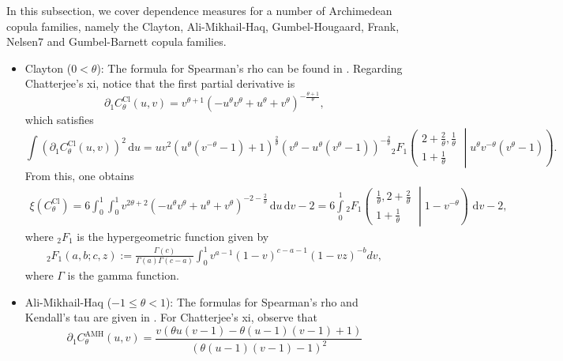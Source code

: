 \documentclass{article}
\def\of#1{\left(#1\right)} %
\newcommand{\de}{\mathrm{\,d}}
\begin{document}
In this subsection, we cover dependence measures for a number of Archimedean copula families, namely the Clayton, Ali-Mikhail-Haq, Gumbel-Hougaard, Frank, Nelsen7 and Gumbel-Barnett copula families.

\begin{itemize}
    \item Clayton ($0<\theta$): 
    The formula for Spearman's rho can be found in \cite[Example 5.4]{Nelsen-2006}.
    Regarding Chatterjee's xi, notice that the first partial derivative is 
    \[
        \partial_1 C^{\text{Cl}}_\theta(u, v)
        = v^{\theta + 1} \left(- u^{\theta} v^{\theta} + u^{\theta} + v^{\theta}\right)^{- \frac{\theta + 1}{\theta}}
    ,\]
    which satisfies
    \small
    \[
        \int(\partial_1 C^{\text{Cl}}_\theta(u, v))^2\de u
        = u v^{2} \left(u^{\theta} \left(v^{- \theta}-1\right) + 1\right)^{\frac{2}{\theta}} \left(v^{\theta} - u^{\theta} \left(v^{\theta} - 1\right) \right)^{- \frac{2}{\theta}} {{}_{2}F_{1}\left(\begin{matrix} 2 + \frac{2}{\theta}, \frac{1}{\theta} \\ 1 + \frac{1}{\theta} \end{matrix}\middle| {u^{\theta} v^{- \theta} (v^{\theta} - 1)} \right)}
    .\]
    \normalsize
    From this, one obtains
    \small
    \begin{align*}
        \xi\of{C^{\text{Cl}}_{\theta}}
        = 6 \int_0^1\int_0^1 v^{2 \theta + 2} \left(- u^{\theta} v^{\theta} + u^{\theta} + v^{\theta}\right)^{-2 - \frac{2}{\theta}} \de u \de v - 2
        = 6 \int\limits_{0}^{1} {{}_{2}F_{1}\left(\begin{matrix} \frac{1}{\theta}, 2 + \frac{2}{\theta} \\ 1 + \frac{1}{\theta} \end{matrix}\middle| {1 - v^{- \theta}} \right)}\, \de v - 2
    ,\end{align*}
    \normalsize
    where ${}_{2}F_{1}$ is the hypergeometric function given by
    \begin{align}\label{frm:hypergeometric_function}
        { }_2 F_1(a, b ; c, z)
        :=\frac{\Gamma(c)}{\Gamma(a) \Gamma(c-a)} \int_0^1 v^{a-1}(1-v)^{c-a-1}(1-v z)^{-b} d v
    ,\end{align}
    where $\Gamma$ is the gamma function.
    \item Ali-Mikhail-Haq ($-1\leq \theta < 1$):
    The formulas for Spearman's rho and Kendall's tau are given in \cite[Exercise 5.10]{Nelsen-2006}.
    For Chatterjee's xi, observe that
    \[
        \partial_1 C^{\text{AMH}}_{\theta}(u,v) = \frac{v \left(\theta u \left(v - 1\right) - \theta \left(u - 1\right) \left(v - 1\right) + 1\right)}{\left(\theta \left(u - 1\right) \left(v - 1\right) - 1\right)^{2}}
\]
\end{itemize}
\end{document}
